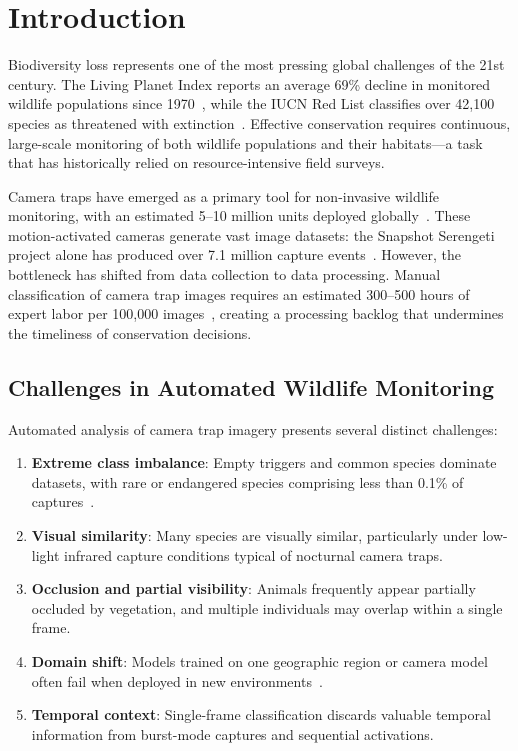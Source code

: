 \section{Introduction}


Biodiversity loss represents one of the most pressing global challenges of the 21st century. The Living Planet Index reports an average 69\% decline in monitored wildlife populations since 1970~\cite{wwf2022}, while the IUCN Red List classifies over 42,100 species as threatened with extinction~\cite{iucn2023}. Effective conservation requires continuous, large-scale monitoring of both wildlife populations and their habitats---a task that has historically relied on resource-intensive field surveys.

Camera traps have emerged as a primary tool for non-invasive wildlife monitoring, with an estimated 5--10 million units deployed globally~\cite{steenweg2017}. These motion-activated cameras generate vast image datasets: the Snapshot Serengeti project alone has produced over 7.1 million capture events~\cite{swanson2015}. However, the bottleneck has shifted from data collection to data processing. Manual classification of camera trap images requires an estimated 300--500 hours of expert labor per 100,000 images~\cite{tabak2019}, creating a processing backlog that undermines the timeliness of conservation decisions.

\subsection{Challenges in Automated Wildlife Monitoring}

Automated analysis of camera trap imagery presents several distinct challenges:

\begin{enumerate}[leftmargin=*]
    \item \textbf{Extreme class imbalance}: Empty triggers and common species dominate datasets, with rare or endangered species comprising less than 0.1\% of captures~\cite{beery2019}.
    \item \textbf{Visual similarity}: Many species are visually similar, particularly under low-light infrared capture conditions typical of nocturnal camera traps.
    \item \textbf{Occlusion and partial visibility}: Animals frequently appear partially occluded by vegetation, and multiple individuals may overlap within a single frame.
    \item \textbf{Domain shift}: Models trained on one geographic region or camera model often fail when deployed in new environments~\cite{beery2018}.
    \item \textbf{Temporal context}: Single-frame classification discards valuable temporal information from burst-mode captures and sequential activations.
\end{enumerate}

